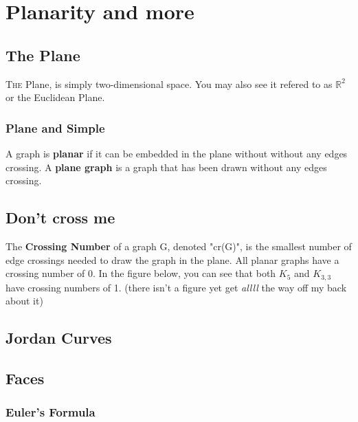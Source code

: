 \chapter{Planarity and more}
\section{The Plane}
\lettrine[lines=4]{T}{he} Plane, is simply two-dimensional space. You may also see it refered to as $\mathbb{R}^2$ or the Euclidean Plane.
\subsection{Plane and Simple}
A graph is \textbf{planar} if it can be embedded in the plane without without any edges crossing.\newline
A \textbf{plane graph} is a graph that has been drawn without any edges crossing.\newline
\begin{figure}[!ht]
	\centering
\end{figure}

\section{Don't cross me}
The \textbf{Crossing Number} of a graph G, denoted "cr(G)", is the smallest number of edge crossings needed to draw the graph in the plane.\newline
All planar graphs have a crossing number of 0. In the figure below, you can see that both $K_5$ and $K_{3,3}$ have crossing numbers of 1. (there isn't a figure yet get \textit{allll} the way off my back about it)

\section{Jordan Curves}
\section{Faces}
\subsection{Euler's Formula}
